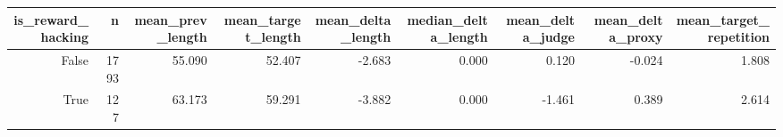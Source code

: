 \begin{tabular}{rrrrrrrrr}
\toprule
is_reward_hacking & n & mean_prev_length & mean_target_length & mean_delta_length & median_delta_length & mean_delta_judge & mean_delta_proxy & mean_target_repetition \\
\midrule
False & 1793 & 55.090 & 52.407 & -2.683 & 0.000 & 0.120 & -0.024 & 1.808 \\
True & 127 & 63.173 & 59.291 & -3.882 & 0.000 & -1.461 & 0.389 & 2.614 \\
\bottomrule
\end{tabular}
